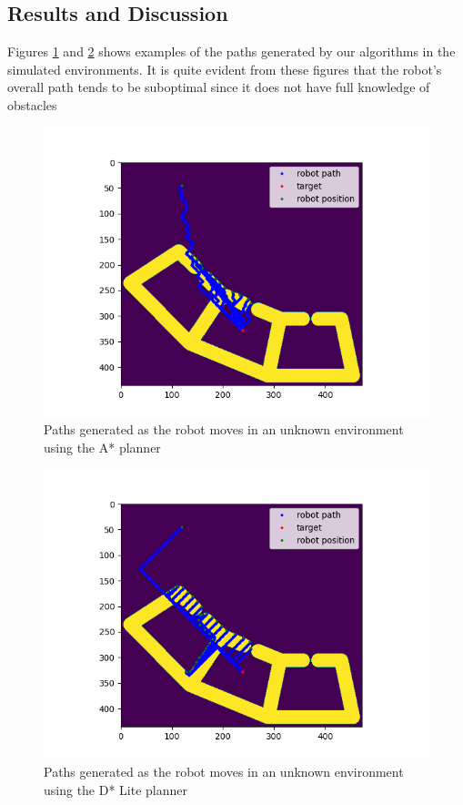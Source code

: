 \documentclass{article}
\begin{document}
\subsection{Results and Discussion}
Figures \ref{fig:paths_A} and \ref{fig:paths_D} shows examples of the paths generated by our algorithms in the simulated environments. It is quite evident from these figures that the robot's overall path tends to be suboptimal since it does not have full knowledge of obstacles
\begin{figure}[h]
    \centering
    \includegraphics[width=0.6\linewidth]{map3_0_1.png}
    \caption{Paths generated as the robot moves in an unknown environment using the A* planner}
    \label{fig:paths_A}
\end{figure}
\begin{figure}[h]
    \centering
    \includegraphics[width=0.6\linewidth]{map3_1_1.png}
    \caption{Paths generated as the robot moves in an unknown environment using the D* Lite planner}
    \label{fig:paths_D}
\end{figure}
\end{document}

